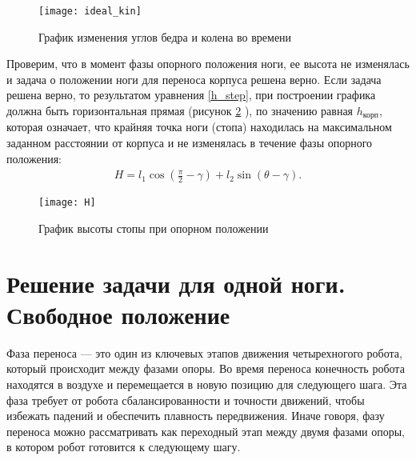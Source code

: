 \begin{figure}[h!]
	\begin{center}
		\texttt{[image: ideal\_kin]}
		\caption{График изменения углов бедра и колена во времени}
		\label{ideal_kin}
	\end{center}
\end{figure}

\newpage 
Проверим, что в момент фазы опорного положения ноги, ее высота не изменялась и задача о положении ноги для переноса корпуса решена верно. Если задача решена верно, то результатом уравнения \ref{h_step}, при построении графика должна быть горизонтальная прямая (рисунок \ref{H} ), по значению равная $h_{\text{корп}}$, которая означает, что крайняя точка ноги (стопа) находилась на максимальном заданном расстоянии от корпуса и не изменялась в течение фазы опорного положения:
\begin{equation}
	\begin{array}{l}
		H = l_{1}\cos({\frac{\pi}{2}-\gamma}) + l_{2}\sin({\theta-\gamma}).
	\end{array}
	\label{h_step}
\end{equation}
\newline
\begin{figure}[h!]
	\begin{center}
		\texttt{[image: H]}
		\caption{График высоты стопы при опорном положении}
		\label{H}
	\end{center}
\end{figure}
\newpage
\section{Решение задачи для одной ноги. Свободное положение}\label{C3_3}
Фаза переноса --- это один из ключевых этапов движения четырехногого робота, который происходит между фазами опоры. Во время переноса конечность робота находятся в воздухе и перемещается в новую позицию для следующего шага. Эта фаза требует от робота сбалансированности и точности движений, чтобы избежать падений и обеспечить плавность передвижения. Иначе говоря, фазу переноса можно рассматривать как переходный этап между двумя фазами опоры, в котором робот готовится к следующему шагу.

